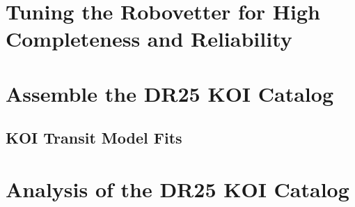 \documentclass[apj,twocolappendix,numberedappendix]{emulateapj}
\renewcommand{\_}{\discretionary{\underscore}{}{\underscore}}  %
\begin{document}
\section{Tuning the Robovetter for High Completeness and Reliability}



\section{Assemble the DR25 KOI Catalog}


\subsection{KOI Transit Model Fits}


\section{Analysis of the DR25 KOI Catalog}












\end{document}
